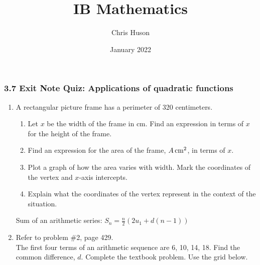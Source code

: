 \documentclass[12pt, twoside]{article}
\title{IB Mathematics}
\author{Chris Huson}
\date{January 2022}
\begin{document}
\subsubsection*{3.7 Exit Note Quiz: Applications of quadratic functions}
\begin{enumerate}
\item A rectangular picture frame has a perimeter of 320 centimeters.
    \begin{enumerate}
        \item Let $x$ be the width of the frame in cm. Find an expression in terms of $x$ for the height of the frame. \vspace{2cm}
        \item Find an expression for the area of the frame, $A \,\rm{cm}^2$, in terms of $x$.  \vspace{2cm}
        \item Plot a graph of how the area varies with width. Mark the coordinates of the vertex and $x$-axis intercepts.
        \item Explain what the coordinates of the vertex represent in the context of the situation. \vspace{4cm}
    \end{enumerate}
    \begin{center}
    \end{center}
    
\newpage
Sum of an arithmetic series: $\displaystyle S_n=\frac{n}{2}(2u_1+d(n-1))$
\item Refer to problem \#2, page 429.\\[0.25cm]
The first four terms of an arithmetic sequence are 6, 10, 14, 18. Find the common difference, $d$. Complete the textbook problem. Use the grid below.
\vspace{8cm}
\begin{center}
\end{center}


\end{enumerate}
\end{document}
